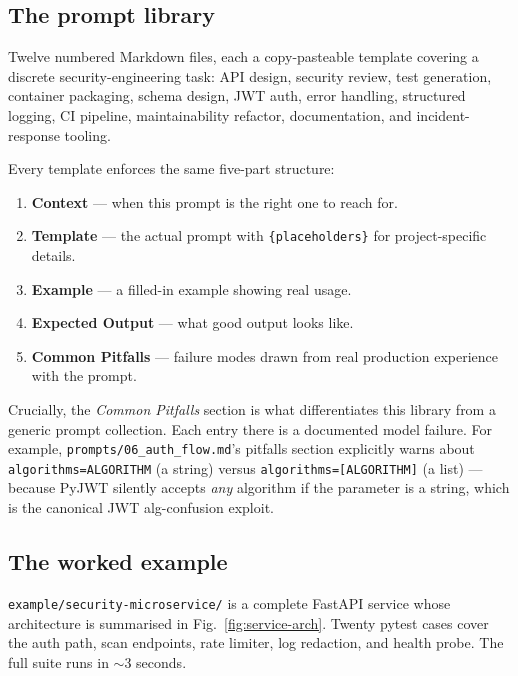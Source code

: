 \documentclass[conference]{IEEEtran}
\begin{document}
\subsection{The prompt library}

Twelve numbered Markdown files, each a copy-pasteable template
covering a discrete security-engineering task: API design, security
review, test generation, container packaging, schema design, JWT
auth, error handling, structured logging, CI pipeline,
maintainability refactor, documentation, and incident-response
tooling.

Every template enforces the same five-part structure:

\begin{enumerate}
\item \textbf{Context} --- when this prompt is the right one to reach
for.
\item \textbf{Template} --- the actual prompt with
\texttt{\{placeholders\}} for project-specific details.
\item \textbf{Example} --- a filled-in example showing real usage.
\item \textbf{Expected Output} --- what good output looks like.
\item \textbf{Common Pitfalls} --- failure modes drawn from real
production experience with the prompt.
\end{enumerate}

Crucially, the \emph{Common Pitfalls} section is what differentiates
this library from a generic prompt collection. Each entry there is
a documented model failure. For example,
\texttt{prompts/06\_auth\_flow.md}'s pitfalls section explicitly
warns about \texttt{algorithms=ALGORITHM} (a string) versus
\texttt{algorithms=[ALGORITHM]} (a list) --- because PyJWT silently
accepts \emph{any} algorithm if the parameter is a string, which is
the canonical JWT alg-confusion exploit.

\subsection{The worked example}

\texttt{example/security-microservice/} is a complete FastAPI
service whose architecture is summarised in
Fig.~\ref{fig:service-arch}. Twenty pytest cases cover the auth
path, scan endpoints, rate limiter, log redaction, and health
probe. The full suite runs in $\sim$3 seconds.
\end{document}
